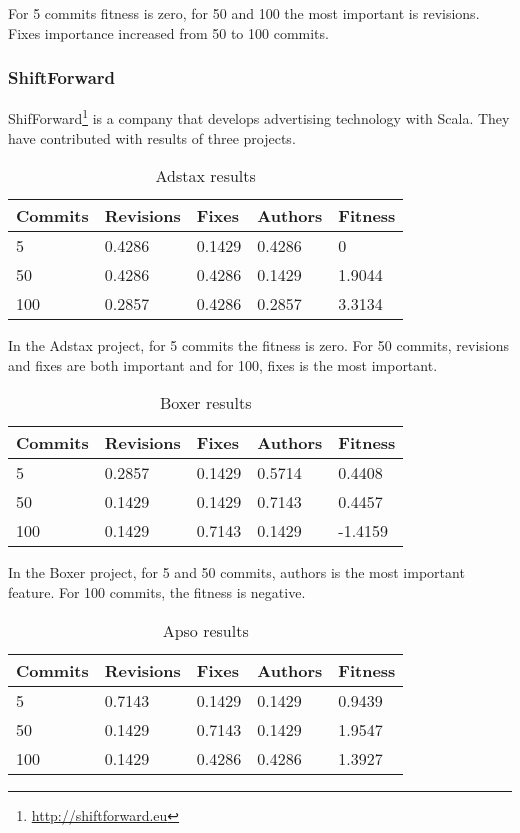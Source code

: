 For 5 commits fitness is zero, for 50 and 100 the most important is revisions. Fixes importance increased from 50 to 100 commits.

\subsubsection{ShiftForward}
ShifForward\footnote{\url{http://shiftforward.eu}} is a company that develops advertising technology with Scala. They have contributed with results of three projects.

\begin{table}[H]
    \centering
    \caption{Adstax results}
    \label{table:learning_adstax}
    \begin{tabular}{|l|l|l|l|l|}
        \hline
        Commits & Revisions & Fixes & Authors & Fitness \\ \hline
        5         & 0.4286     & 0.1429 & 0.4286   & 0 \\ \hline
        50        & 0.4286 & 0.4286 & 0.1429   & 1.9044 \\ \hline    
        100       & 0.2857     & 0.4286  & 0.2857   & 3.3134 \\ \hline
    \end{tabular}
\end{table}

In the Adstax project, for 5 commits the fitness is zero. For 50 commits, revisions and fixes are both important and for 100, fixes is the most important.

\begin{table}[H]
    \centering
    \caption{Boxer results}
    \label{table:learning_boxer}
    \begin{tabular}{|l|l|l|l|l|}
        \hline
        Commits & Revisions & Fixes & Authors & Fitness \\ \hline
        5         & 0.2857     & 0.1429 & 0.5714   & 0.4408 \\ \hline
        50        & 0.1429 & 0.1429 & 0.7143   & 0.4457  \\ \hline
        100       & 0.1429     & 0.7143  & 0.1429   & -1.4159 \\ \hline
    \end{tabular}
\end{table}

In the Boxer project, for 5 and 50 commits, authors is the most important feature. For 100 commits, the fitness is negative.

\begin{table}[H]
    \centering
    \caption{Apso results}
    \label{table:learning_apso}
    \begin{tabular}{|l|l|l|l|l|}
        \hline
        Commits & Revisions & Fixes & Authors & Fitness \\ \hline
        5         & 0.7143     & 0.1429 & 0.1429   & 0.9439 \\ \hline
        50        & 0.1429 & 0.7143 & 0.1429   & 1.9547 \\ \hline
        100       & 0.1429     & 0.4286  & 0.4286   & 1.3927 \\ \hline
    \end{tabular}
\end{table}

